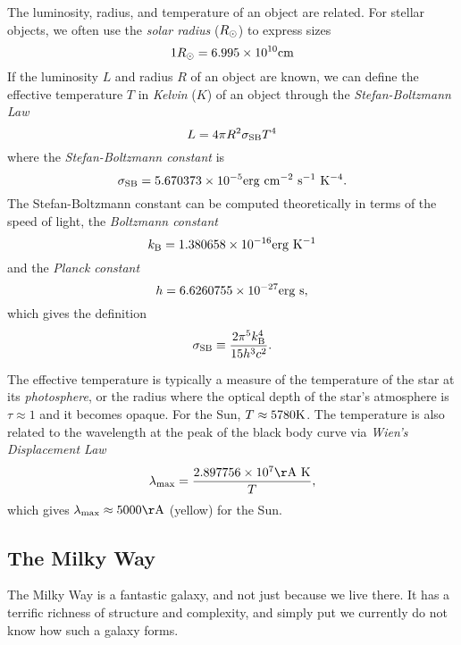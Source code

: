 \documentclass[]{article}
\begin{document}
The luminosity, radius, and temperature of an object are related. For stellar
objects, we often use the {\it solar radius} ($R_{\odot}$) to express sizes
\begin{equation}
1R_{\odot} = 6.995 \times 10^{10} \mathrm{cm}
\end{equation}
\noindent
If the luminosity $L$ and radius $R$ of an object are known, we can define
the effective temperature $T$ in {\it Kelvin} ($K$)
of an object through the {\it Stefan-Boltzmann Law}
\begin{equation}
L = 4\pi R^{2}\sigma_{\mathrm{SB}} T^{4}
\end{equation}
\noindent
where the {\it Stefan-Boltzmann constant} is
\begin{equation}
\sigma_{\mathrm{SB}} = 5.670373\times10^{-5} \mathrm{erg}~\mathrm{cm}^{-2}~\mathrm{s}^{-1}~\mathrm{K}^{-4}.
\end{equation}
The Stefan-Boltzmann constant can be computed theoretically in
terms of the speed of light, the {\it Boltzmann constant}
\begin{equation}
k_{\mathrm{B}} = 1.380658\times10^{-16} \mathrm{erg}~\mathrm{K}^{-1}
\end{equation}
\noindent
and the {\it Planck constant}
\begin{equation}
h = 6.6260755\times10^{-27}\mathrm{erg}~\mathrm{s},
\end{equation}
\noindent
which gives the definition
\begin{equation}
\sigma_{\mathrm{SB}} \equiv \frac{2\pi^5 k_{\mathrm{B}}^4}{15 h^3 c^2}.
\end{equation}

The effective temperature is typically a measure of the temperature
of the star at its {\it photosphere}, or the radius where the optical
depth of the star's atmosphere is $\tau\approx1$ and it becomes opaque. 
For the Sun,
$T\approx5780\mathrm{K}$. The temperature is also related to the wavelength
at the peak of the black body curve via {\it Wien's Displacement Law}
\begin{equation}
\lambda_{\mathrm{max}} = \frac{2.897756\times10^{7} \Ang~\K}{T},
\end{equation}
which gives $\lambda_{\mathrm{max}}\approx5000\Ang$ (yellow)
for the Sun.

\subsection{The Milky Way}

The Milky Way is a fantastic galaxy, and not just because we live there.
It has a terrific richness of structure and complexity, and simply put we
currently do not know how such a galaxy forms.
\end{document}
